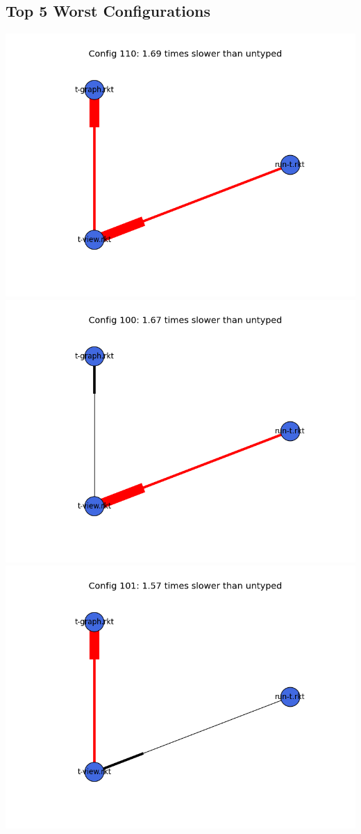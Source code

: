 \documentclass{article}
\begin{document}
\begin{itemize}
\subsection{Top 5 Worst Configurations}
\includegraphics[width=\textwidth]{mbta-stressfree-module-graph-110.png}
\includegraphics[width=\textwidth]{mbta-stressfree-module-graph-100.png}
\includegraphics[width=\textwidth]{mbta-stressfree-module-graph-101.png}

\end{itemize}
\end{document}
